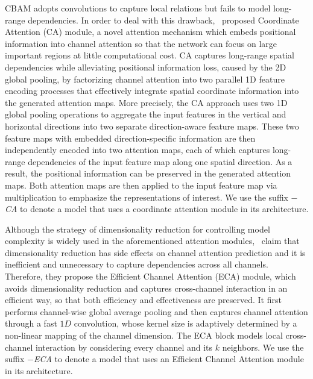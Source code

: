 \documentclass[journal]{IEEEtran}
\begin{document}
CBAM adopts convolutions to capture local relations but fails to model long-range dependencies. In order to deal with this drawback,~\citep{Hou_2021_CVPR} proposed Coordinate Attention (CA) module, a novel attention mechanism which embeds positional information into channel attention so that the network can focus on large important regions at little computational cost. CA captures long-range spatial dependencies while alleviating positional information loss, caused by the 2D global pooling, by factorizing channel attention into two parallel 1D feature encoding processes that effectively integrate spatial coordinate information into the generated attention maps. More precisely, the CA approach uses two 1D global pooling operations to aggregate the input features in the vertical and horizontal directions into two separate direction-aware feature maps. These two feature maps with embedded direction-specific information are then independently encoded into two attention maps, each of which captures long-range dependencies of the input feature map along one spatial direction. As a result, the positional information can be preserved in the generated attention maps. Both attention maps are then applied to the input feature map via multiplication to emphasize the representations of interest. We use the suffix \textit{$-$CA} to denote a model that uses a coordinate attention module in its architecture.

Although the strategy of dimensionality reduction for controlling model complexity is widely used in the aforementioned attention modules,~\cite{wang2020ecanet} claim that dimensionality reduction has side effects on channel attention prediction and it is inefficient and unnecessary to capture dependencies across all channels. Therefore, they propose the Efficient Channel Attention (ECA) module, which avoids dimensionality reduction and captures cross-channel interaction in an efficient way, so that both efficiency and effectiveness are preserved. It first performs channel-wise global average pooling and then captures channel attention through a fast $1D$ convolution, whose kernel size is adaptively determined by a non-linear mapping of the channel dimension. The ECA block models local cross-channel interaction by considering every channel and its $k$ neighbors. We use the suffix \textit{$-$ECA} to denote a model that uses an Efficient Channel Attention module in its architecture.
\end{document}
